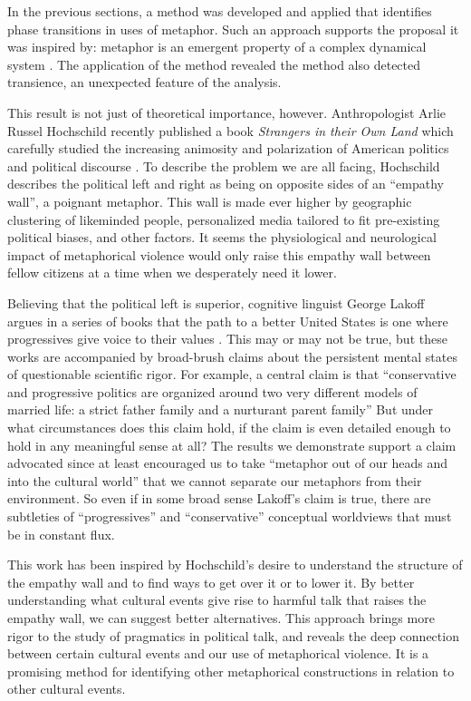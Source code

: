 In the previous sections, a method was developed and applied that identifies
phase transitions in uses of metaphor. Such an approach supports the 
proposal it was inspired by: metaphor is an emergent property of a complex
dynamical system \cite{Cameron2006}. The application of the method revealed 
the method also detected transience, an unexpected feature of the analysis.

This result is not just of theoretical importance, however. Anthropologist
Arlie Russel Hochschild recently published a book \textit{Strangers in their
Own Land} which carefully studied the increasing animosity and 
polarization of American politics and political discourse \cite{Hochschild2016}.
To describe the problem we are all facing, Hochschild 
describes the political left and right as being on opposite sides of
an ``empathy wall'', a poignant metaphor. 
This wall is made ever higher by geographic clustering of likeminded people,
personalized media tailored to fit pre-existing political biases, and other 
factors. It seems the physiological and neurological impact of metaphorical
violence would only raise this empathy wall between fellow citizens at a time
when we desperately need it lower.

Believing that the political left is superior, cognitive linguist George Lakoff
argues in a series of books that the path to a better United States is 
one where progressives give voice to their values 
\cite{Lakoff1996, Lakoff2004, Lakoff2008, Lakoff2012}. 
This may or may not be true, 
but these works are accompanied by broad-brush claims about the persistent
mental states of questionable scientific rigor. For example, a central
claim is that ``conservative and progressive politics are organized around 
two very different models of married life: a strict father family and a 
nurturant parent family'' \cite[p.47]{Lakoff2004} But
under what circumstances does this claim hold, if the claim is even detailed
enough to hold in any meaningful sense at all? The results we demonstrate
support a claim advocated since at least  
encouraged us to take ``metaphor out of our heads and into the cultural
world'' that 
we cannot separate our metaphors from their environment. So even if in some
broad sense Lakoff's claim is true, there are subtleties of ``progressives''
and ``conservative'' conceptual worldviews that must be in constant flux.

This work has been inspired by Hochschild's desire to understand the structure
of the empathy wall and to find ways to get over it or to lower it. By better
understanding what cultural events give rise to harmful talk that raises
the empathy wall, we can suggest better alternatives. This approach brings
more rigor to the study of pragmatics in political talk, and reveals the
deep connection between certain cultural events and our use of metaphorical
violence. It is a promising method for identifying other metaphorical 
constructions in relation to other cultural events.

